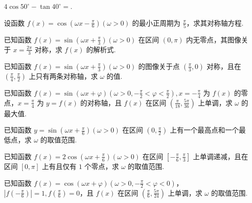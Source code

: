 \documentclass[a4paper , final]{ctexart}
\newenvironment{problem}[1]{%
  \item #1
  \par
  \vspace{8cm}
}{}
\begin{document}
\begin{problems}
    \begin{problem}
    {
    $4\cos{50^\circ}-\tan{40^\circ}=$\underline{\hspace{1.5cm}}.
    }
    \end{problem}

    \begin{problem}
    {
    设函数 $f(x) = \cos(\omega x -\frac{\pi}{6})(\omega > 0)$ 的最小正周期为 $\frac{\pi}{5}$，求其对称轴方程.
    }
    \end{problem}

    \begin{problem}
    {
    已知函数 $f(x) = \sin(\omega x +\frac{\pi}{3})(\omega > 0)$ 在区间 $(0,\pi)$ 内无零点，其图像关于 $x=\frac{2\pi}{3}$ 对称，求 $f(x)$ 的解析式.
    }
    \end{problem}

    \begin{problem}
    {
    已知函数 $f(x) = \sin(\omega x +\frac{\pi}{3})(\omega > 0)$ 的图像关于点 $(\frac{\pi}{3},0)$ 对称，且在 $(\frac{\pi}{4},\frac{\pi}{2})$ 上只有两条对称轴，求 $\omega$ 的值.
    }
    \end{problem}

    \begin{problem}
    {
    已知函数 $f(x) = \sin(\omega x +\varphi)(\omega > 0,-\frac{\pi}{2}<\varphi<\frac{\pi}{2}),x=-\frac{\pi}   {4}$ 为 $f(x)$ 的零点，$x=\frac{\pi}{4}$ 为 $y=f(x)$ 的对称轴，且 $f(x)$ 在区间 $\left(\frac{\pi}  {18},\frac{5\pi}{36}\right)$ 上单调，求 $\omega$ 的最大值.
    }
    \end{problem}

    \begin{problem}
    {
    已知函数 $y = \sin(\omega x +\frac{\pi}{6})(\omega > 0)$ 在区间 $(0,\frac{\pi}{2})$ 上有一个最高点和一个最低点，求 $\omega$ 的取值范围.
    }
    \end{problem}

    \begin{problem}
    {
    已知函数 $f(x) = 2\cos(\omega x +\frac{\pi}{6})(\omega > 0)$ 在区间 $[-\frac{\pi}{6},\frac{\pi}{3}]$ 上单调递减，且在区间 $[0,\pi]$ 上有且仅有 $1$ 个零点，求 $\omega$ 的取值范围.
    }
    \end{problem}

    \begin{problem}
    {
    已知函数 $f(x) = \cos(\omega x +\varphi)(\omega > 0,-\frac{\pi}{2}<\varphi<0)$，$\left\vert f(-\frac{\pi}{6})\right\vert=1,f(\frac{\pi}{6})=0$，且 $f(x)$ 在区间 $\left(\frac{\pi}{6},\frac{5\pi}{24}\right)$ 上单调，求 $\omega$ 的取值范围.
    }
    \end{problem}
\end{problems}
\end{document}
